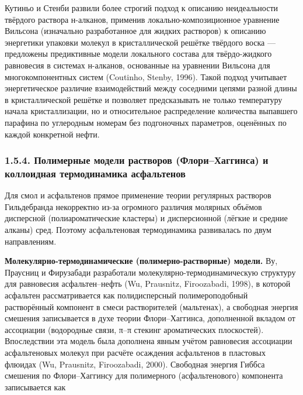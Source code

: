 \documentclass[11pt]{extarticle}
\begin{document}
Кутиньо и Стенби развили более строгий подход к описанию неидеальности твёрдого раствора н-алканов, применив локально-композиционное уравнение Вильсона (изначально разработанное для жидких растворов) к описанию энергетики упаковки молекул в кристаллической решётке твёрдого воска --- предложены предиктивные модели локального состава для твёрдо-жидкого равновесия в системах н-алканов, основанные на уравнении Вильсона для многокомпонентных систем (Coutinho, Stenby, 1996). Такой подход учитывает энергетическое различие взаимодействий между соседними цепями разной длины в кристаллической решётке и позволяет предсказывать не только температуру начала кристаллизации, но и относительное распределение количества выпавшего парафина по углеродным номерам без подгоночных параметров, оценённых по каждой конкретной нефти.

\subsubsection{1.5.4. Полимерные модели растворов (Флори--Хаггинса) и коллоидная термодинамика асфальтенов}\label{ux43fux43eux43bux438ux43cux435ux440ux43dux44bux435-ux43cux43eux434ux435ux43bux438-ux440ux430ux441ux442ux432ux43eux440ux43eux432-ux444ux43bux43eux440ux438ux445ux430ux433ux433ux438ux43dux441ux430-ux438-ux43aux43eux43bux43bux43eux438ux434ux43dux430ux44f-ux442ux435ux440ux43cux43eux434ux438ux43dux430ux43cux438ux43aux430-ux430ux441ux444ux430ux43bux44cux442ux435ux43dux43eux432}

Для смол и асфальтенов прямое применение теории регулярных растворов Гильдебранда некорректно из-за огромного различия молярных объёмов дисперсной (полиароматические кластеры) и дисперсионной (лёгкие и средние алканы) сред. Поэтому асфальтеновая термодинамика развивалась по двум направлениям.

\textbf{Молекулярно-термодинамические (полимерно-растворные) модели.} Ву, Праусниц и Фирузабади разработали молекулярно-термодинамическую структуру для равновесия асфальтен--нефть (Wu, Prausnitz, Firoozabadi, 1998), в которой асфальтен рассматривается как полидисперсный полимероподобный растворённый компонент в смеси растворителей (мальтенах), а свободная энергия смешения записывается в духе теории Флори--Хаггинса, дополненной вкладом от ассоциации (водородные связи, π--π стекинг ароматических плоскостей). Впоследствии эта модель была дополнена явным учётом равновесия ассоциации асфальтеновых молекул при расчёте осаждения асфальтенов в пластовых флюидах (Wu, Prausnitz, Firoozabadi, 2000). Свободная энергия Гиббса смешения по Флори--Хаггинсу для полимерного (асфальтенового) компонента записывается как
\end{document}
